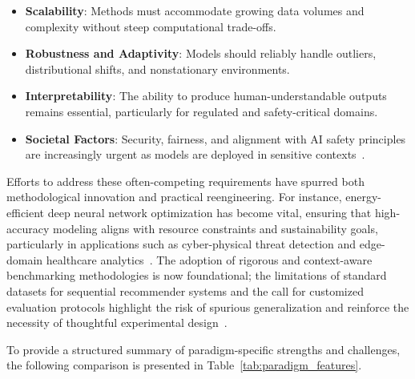 \begin{itemize}
    \item \textbf{Scalability}: Methods must accommodate growing data volumes and complexity without steep computational trade-offs.
    \item \textbf{Robustness and Adaptivity}: Models should reliably handle outliers, distributional shifts, and nonstationary environments.
    \item \textbf{Interpretability}: The ability to produce human-understandable outputs remains essential, particularly for regulated and safety-critical domains.
    \item \textbf{Societal Factors}: Security, fairness, and alignment with AI safety principles are increasingly urgent as models are deployed in sensitive contexts~\cite{ref79,ref85}.
\end{itemize}

Efforts to address these often-competing requirements have spurred both methodological innovation and practical reengineering. For instance, energy-efficient deep neural network optimization has become vital, ensuring that high-accuracy modeling aligns with resource constraints and sustainability goals, particularly in applications such as cyber-physical threat detection and edge-domain healthcare analytics~\cite{ref61}. The adoption of rigorous and context-aware benchmarking methodologies is now foundational; the limitations of standard datasets for sequential recommender systems and the call for customized evaluation protocols highlight the risk of spurious generalization and reinforce the necessity of thoughtful experimental design~\cite{ref73,ref87}.

To provide a structured summary of paradigm-specific strengths and challenges, the following comparison is presented in Table~\ref{tab:paradigm_features}.

